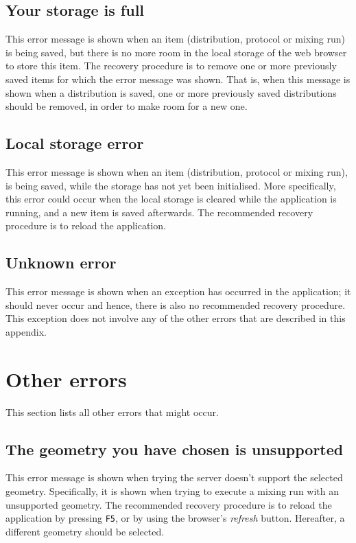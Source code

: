 \subsection{Your storage is full}
This error message is shown when an item (distribution, protocol or mixing run) is being saved, but there is no more room in the local storage of the web browser to store this item. The recovery procedure is to remove one or more previously saved items for which the error message was shown. That is, when this message is shown when a distribution is saved, one or more previously saved distributions should be removed, in order to make room for a new one.

\subsection{Local storage error}
This error message is shown when an item (distribution, protocol or mixing run), is being saved, while the storage has not yet been initialised. More specifically, this error could occur when the local storage is cleared while the application is running, and a new item is saved afterwards. The recommended recovery procedure is to reload the application. 

\subsection{Unknown error}
This error message is shown when an exception has occurred in the application; it should never occur and hence, there is also no recommended recovery procedure. This exception does not involve any of the other errors that are described in this appendix.

\section{Other errors}
This section lists all other errors that might occur.

\subsection{The geometry you have chosen is unsupported}
This error message is shown when trying the server doesn't support the selected geometry. Specifically, it is shown when trying to execute a mixing run with an unsupported geometry. The recommended recovery procedure is to reload the application by pressing \texttt{F5}, or by using the browser's \emph{refresh} button. Hereafter, a different geometry should be selected.


